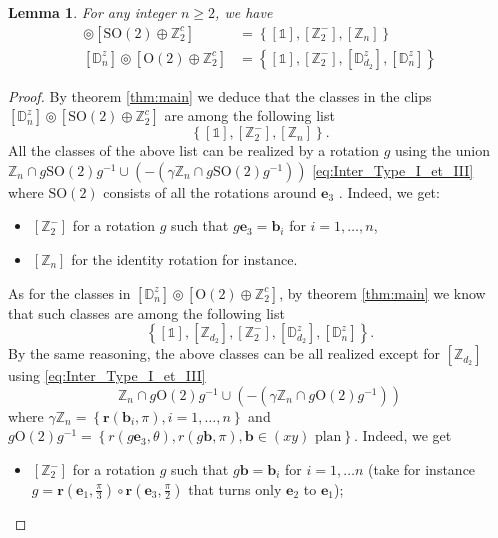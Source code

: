 \documentclass[11pt,a4paper]{amsart}
\newtheorem{lem}[thm]{Lemma}
\theoremstyle{definition}
\newcommand{\ZZ}{\mathbb{Z}}                %
\newcommand{\OO}{\mathrm{O}}                %
\newcommand{\SO}{\mathrm{SO}}               %
\newcommand{\DD}{\mathbb{D}}                %
\newcommand{\1}{\mathds{1}}		            %
\newcommand{\ee}{\pmb{e}}                   %
\newcommand{\vR}{\mathbf{r}}
\newcommand{\bb}{\mathbf{b}}
\newcommand{\set}[1]{\left\{#1\right\}}     %
\newcommand{\Dnz}{\DD_n^z}
\begin{document}
\begin{lem}\label{lem:DnzwithO(2)}
  For any integer $n\geq 2$, we have
  \begin{align*}
    [\DD_{n}^{z}] \circledcirc [\SO(2) \oplus \ZZ_2^c] & =\set{[\1],[\ZZ_2^-],[\ZZ_n]} \\
    [\DD_{n}^{z}] \circledcirc [\OO(2) \oplus \ZZ_2^c] & =
    \set{[\1],[\ZZ_2^-],[\DD_{d_2}^z],[\Dnz]}
  \end{align*}
\end{lem}


\begin{proof}
By theorem \ref{thm:main} we deduce that the classes in the clips $[\DD_{n}^{z}] \circledcirc [\SO(2) \oplus \ZZ_2^c]$ are among the following list
		\begin{equation*}
		\set{[\1],[\ZZ_2^-],[\ZZ_n]}.
		\end{equation*} 
	All the classes of the above list can be realized by a rotation $g$ using the union $ \ZZ_n\cap g\SO(2)g^{-1} \cup (-(\gamma\ZZ_n\cap g\SO(2)g^{-1}))$ \eqref{eq:Inter_Type_I_et_III} where $\SO(2)$ consists of all the rotations around $\ee_3$ . Indeed, we get:
	\begin{itemize}
		\item $[\ZZ_2^-]$ for a rotation $g$ such that $g\ee_3=\bb_i$ for $i=1,\dotsc,n$,
		\item $[\ZZ_n]$ for the identity rotation for instance.
	\end{itemize}
As for the classes in $[\DD_{n}^{z}] \circledcirc [\OO(2) \oplus \ZZ_2^c]$, by theorem \ref{thm:main} we know that such classes are among the following list
		\begin{equation*}
	\set{[\1],[\ZZ_{d_2}],[\ZZ_2^-],[\DD_{d_2}^z],[\DD_n^z]}.
	\end{equation*}
	By the same reasoning, the above classes can be all realized except for $[\ZZ_{d_2}]$ using \eqref{eq:Inter_Type_I_et_III}
	\begin{equation*}
	\ZZ_n\cap g\OO(2)g^{-1} \cup (-(\gamma\ZZ_n\cap g\OO(2)g^{-1}))
	\end{equation*}
	where $\gamma\ZZ_n=\set{\vR(\bb_i,\pi),i=1,\dotsc,n}$ and $g\OO(2)g^{-1}=\set{r(g\ee_3,\theta),r(g\bb,\pi),\bb\in (xy)\text{ plan}}$. Indeed, we get
	\begin{itemize}
		\item $[\ZZ_2^-]$ for a rotation $g$ such that $g\bb=\bb_i$ for $ i=1,\dotsc n$ (take for instance $g=\vR\left(\ee_1,\frac{\pi}{3}\right)\circ \vR\left(\ee_3,\frac{\pi}{2}\right)$ that turns only $\ee_2$ to $\ee_1$);

\end{itemize}
\end{proof}
\end{document}

